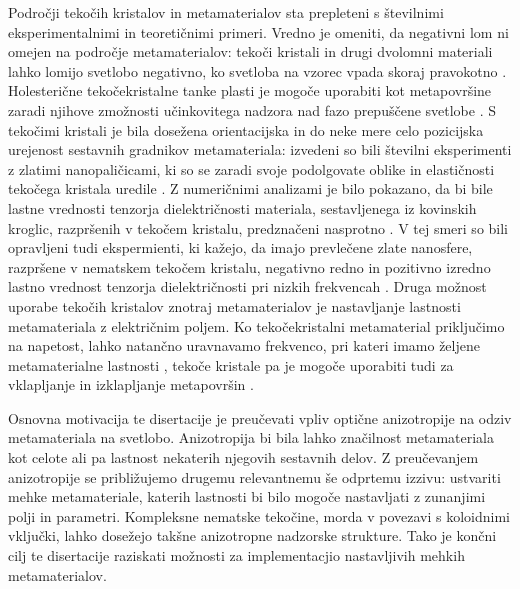 \documentclass[a4paper,11pt]{article}
\begin{document}
Področji tekočih kristalov in metamaterialov sta prepleteni s številnimi eksperimentalnimi in teoretičnimi primeri. 
Vredno je omeniti, da negativni lom ni omejen na področje metamaterialov: tekoči kristali in drugi dvolomni materiali lahko lomijo svetlobo negativno, ko svetloba na vzorec vpada skoraj pravokotno \cite{lavrentovich-2006-lc-neg}. 
Holesterične tekočekristalne tanke plasti je mogoče uporabiti kot metapovršine zaradi njihove zmožnosti učinkovitega nadzora nad fazo prepuščene svetlobe \cite{ozaki-2016-patterned-lc}. 
S tekočimi kristali je bila dosežena orientacijska in do neke mere celo pozicijska urejenost sestavnih gradnikov metamateriala: izvedeni so bili številni eksperimenti z zlatimi nanopaličicami, ki so se zaradi svoje podolgovate oblike in elastičnosti tekočega kristala uredile \cite{lavrentovich-2008-gold-nanorods,smalyukh-2010-self-alignment,lavrentovich-2009-nanorods}. 
Z numeričnimi analizami je bilo pokazano, da bi bile lastne vrednosti tenzorja dielektričnosti materiala, sestavljenega iz kovinskih kroglic, razpršenih v tekočem kristalu, predznačeni nasprotno \cite{xuan-2013-nanoparticle-lc,khoo-2014-nanoparticle-lc}. 
V tej smeri so bili opravljeni tudi ekspermienti, ki kažejo, da imajo prevlečene zlate nanosfere, razpršene v nematskem tekočem kristalu, negativno redno in pozitivno izredno lastno vrednost tenzorja dielektričnosti pri nizkih frekvencah \cite{goodby-2011-lc-gold-mtm}.
Druga možnost uporabe tekočih kristalov znotraj metamaterialov je nastavljanje lastnosti metamateriala z električnim poljem. 
Ko tekočekristalni metamaterial priključimo na napetost, lahko natančno uravnavamo frekvenco, pri kateri imamo željene metamaterialne lastnosti \cite{zhang-2007-lc-mtm-tuning,shalaev-2007-tunable-lc,baets-2011-ring-resonators}, tekoče kristale pa je mogoče uporabiti tudi za vklapljanje in izklapljanje metapovršin \cite{buchnev-2015-lc-mtm-switch}. 

Osnovna motivacija te disertacije je preučevati vpliv optične anizotropije na odziv metamateriala na svetlobo. 
Anizotropija bi bila lahko značilnost metamateriala kot celote ali pa lastnost nekaterih njegovih sestavnih delov. 
Z preučevanjem anizotropije se približujemo drugemu relevantnemu še odprtemu izzivu: ustvariti mehke metamateriale, katerih lastnosti bi bilo mogoče nastavljati z zunanjimi polji in parametri. 
Kompleksne nematske tekočine, morda v povezavi s koloidnimi vključki, lahko dosežejo takšne anizotropne nadzorske strukture. 
Tako je končni cilj te disertacije raziskati možnosti za implementacjio nastavljivih mehkih metamaterialov.
\end{document}
